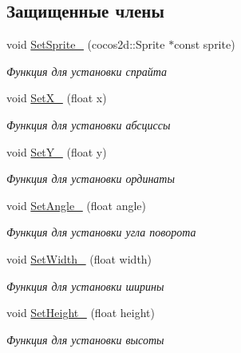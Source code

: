 \subsection*{Защищенные члены}
\begin{DoxyCompactItemize}
\item 
void \hyperlink{classrtm_1_1_world_object_ae8f0605c11c95bf6eae8f42c24fc4130}{Set\+Sprite\+\_\+} (cocos2d\+::\+Sprite $\ast$const sprite)
\begin{DoxyCompactList}\small\item\em Функция для установки спрайта \end{DoxyCompactList}\item 
void \hyperlink{classrtm_1_1_world_object_a66fcf7be3345584be9f06e00a79da559}{Set\+X\+\_\+} (float x)
\begin{DoxyCompactList}\small\item\em Функция для установки абсциссы \end{DoxyCompactList}\item 
void \hyperlink{classrtm_1_1_world_object_a2d9de0f03e711f7b2486889d7336c9d3}{Set\+Y\+\_\+} (float y)
\begin{DoxyCompactList}\small\item\em Функция для установки ординаты \end{DoxyCompactList}\item 
void \hyperlink{classrtm_1_1_world_object_a3185c36d5138dde6f6942b101586cee4}{Set\+Angle\+\_\+} (float angle)
\begin{DoxyCompactList}\small\item\em Функция для установки угла поворота \end{DoxyCompactList}\item 
void \hyperlink{classrtm_1_1_world_object_ad11ace9402b562b5c2aa6817c4b1cc9f}{Set\+Width\+\_\+} (float width)
\begin{DoxyCompactList}\small\item\em Функция для установки ширины \end{DoxyCompactList}\item 
void \hyperlink{classrtm_1_1_world_object_a60904037c13f9cf151cd28f040ac5f02}{Set\+Height\+\_\+} (float height)
\begin{DoxyCompactList}\small\item\em Функция для установки высоты \end{DoxyCompactList}\item 
\mbox{\label{classrtm_1_1_world_object_a4adc266618f3aeb94ae55df76f0716dc}} 

\end{DoxyCompactItemize}
